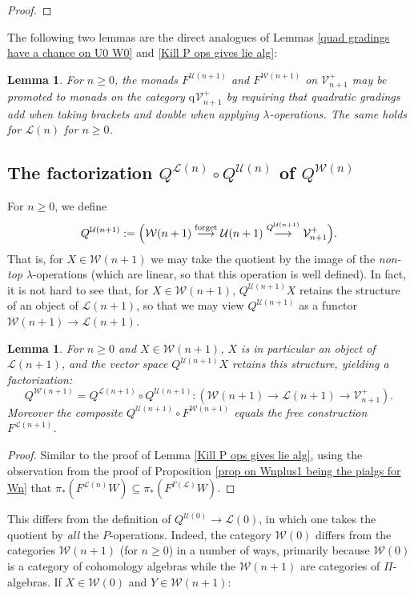 \documentclass[11pt]{amsart} \renewcommand{\baselinestretch}{1.2}
\theoremstyle{plain}
\newtheorem{lem}[thm]{Lemma}
\numberwithin{equation}{section} %
\theoremstyle{plain}
\newtheorem{lem}[thm]{Lemma}
\numberwithin{equation}{chapter} %
\renewcommand{\to}{\longrightarrow}
\newcommand{\scrL}{\mathscr{L}}
\newcommand{\calU}{\mathcal{U}}
\newcommand{\calL}{\mathcal{L}}
\newcommand{\calV}{\mathcal{V}}
\newcommand{\calw}{\mathcal{W}}
\newcommand{\call}{\mathcal{L}}
\newcommand{\LieOperad}{{\scrL}}
\newcommand{\vect}[2]{\calV^{#1}_{#2}}
\newcommand{\quadgrad}[1]{\mathrm{q}_{#1}}
\newcommand{\SubsectionOrSection}[1]{\subsection{#1}}
\begin{document}
\begin{homotopy operations for PRLs}
\begin{proof}
\end{proof}
The following two lemmas are the direct analogues of Lemmas \ref{quad gradings have a chance on U0 W0} and \ref{Kill P ops gives lie alg}:
\begin{lem}
\label{quad gradings have a chance on Un Wn}
For $n\geq0$, the monads $F^{\calU(n+1)}$ and $F^{\calw(n+1)}$ on $\vect{+}{n+1}$ may be promoted to monads on the category $\quadgrad{}\vect{+}{n+1}$ by requiring that quadratic gradings add when taking brackets and double when applying $\lambda$-operations. The same holds for $\call(n)$ for $n\geq0$.
\end{lem}
\SubsectionOrSection{The factorization $Q^{\calL(n)}\circ Q^{\calU(n)}$ of $Q^{\calw(n)}$}
For $n\geq0$, we define
\[Q^{\calU(n+1)}:=\Bigl(\calw(n+1)\overset{\textup{forget}}{\to}\calU(n+1)\overset{Q^{\calU(n+1)}}{\to}\vect{+}{n+1}\Bigr).\]
That is, for $X\in\calw(n+1)$ we may take the quotient by the image of the \emph{non-top} $\lambda$-operations (which are linear, so that this operation is well defined). In fact, it is not hard to see that, for $X\in\calw(n+1)$, $Q^{\calU(n+1)}X$ retains the structure of an object of $\calL(n+1)$, so that we may view $Q^{\calU(n+1)}$ as a functor $\calw(n+1)\to \calL(n+1)$.
\begin{lem}
\label{Kill lambda ops gives lie alg}
For $n\geq0$ and $X\in\calw(n+1)$, $X$ is in particular an object of $\calL(n+1)$, and the vector space $Q^{\calU(n+1)}X$ retains this structure, yielding a factorization:%
\[Q^{\calw(n+1)}=Q^{\calL(n+1)}\circ Q^{\calU(n+1)}:\left(\calw(n+1)\to \calL(n+1)\to \vect{+}{n+1}\right).\]
Moreover the composite $Q^{\calU(n+1)}\circ F^{\calw(n+1)}$ equals the free construction $F^{\calL(n+1)}$.
\end{lem}
\begin{proof}
Similar to the proof of Lemma \ref{Kill P ops gives lie alg}, using the observation from the proof of Proposition \ref{prop on Wnplus1 being the pialgs for Wn} that $\pi_*(F^{\calL(n)}W)\subseteq\pi_*(F^{\Gamma(\LieOperad)}W)$.
\end{proof}
This differs from the definition of $Q^{\calU(0)}\to \calL(0)$, in which one takes the quotient by \emph{all} the $P$-operations.
Indeed, the category $\calw(0)$ differs from the categories $\calw(n+1)$ (for $n\geq0$) in a number of ways, primarily because $\calw(0)$ is a category of cohomology algebras while the $\calw(n+1)$ are categories of $\Pi$-algebras. If $X\in\calw(0)$ and $Y\in \calw(n+1) $:

\end{homotopy operations for PRLs}
\end{document}
